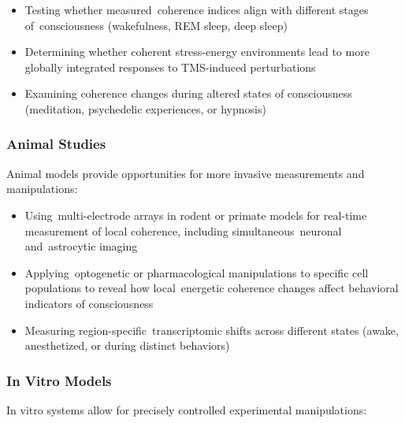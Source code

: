 \begin{itemize}
    \item Testing whether measured~coherence indices align with different stages of~consciousness (wakefulness, REM sleep, deep sleep)~\cite{DiNuzzo2017}
    
    \item Determining whether coherent stress-energy environments lead to more globally integrated responses to TMS-induced perturbations~\cite{Casali2013, Massimini2018}
    
    \item Examining coherence changes during altered states of consciousness (meditation, psychedelic experiences, or hypnosis)
\end{itemize}

\subsubsection*{Animal Studies}

Animal models provide opportunities for more invasive measurements and manipulations:

\begin{itemize}
    \item Using~multi-electrode arrays in rodent or primate models for real-time measurement of local coherence, including simultaneous~neuronal and~astrocytic imaging~\cite{Chow2020}
    
    \item Applying~optogenetic or pharmacological manipulations to specific cell populations to reveal how local~energetic coherence changes affect behavioral indicators of consciousness~\cite{Yizhar2011}
    
    \item Measuring region-specific~transcriptomic shifts across different states (awake, anesthetized, or during distinct behaviors)~\cite{Zeng2017}
\end{itemize}

\subsubsection*{In Vitro Models}

In vitro systems allow for precisely controlled experimental manipulations:

